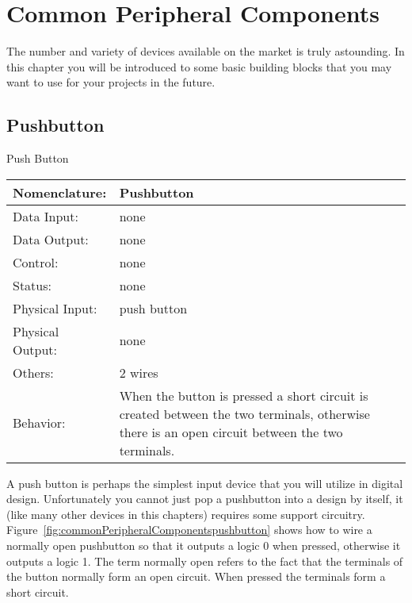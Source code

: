 \chapter{Common Peripheral Components}
\label{chapter:Common Peripheral Components}
\graphicspath{ {./chapter10/Fig} }

The number and variety of devices available on the market
is truly astounding.  In this chapter you will be introduced
to some basic building blocks that you may want to use for
your projects in the future.

\section{Pushbutton}
    \label{page:pushbutton}
    \begin{buildingblock}{Push Button}
        \begin{tabular}{|l|p{3.5in}|} \hline
            Nomenclature:  & Pushbutton         \\ \hline
            Data Input:    & none         \\ \hline
            Data Output:   & none   \\ \hline
            Control:       & none           \\ \hline
            Status:        & none                                   \\ \hline
            Physical Input:& push button        \\ \hline
            Physical Output:& none        \\ \hline
            Others:        & 2 wires             \\ \hline
            Behavior:      & When the button is pressed a short circuit is created
            between the two terminals, otherwise there is an open circuit between
            the two terminals. \\ \hline
        \end{tabular}
    \end{buildingblock}

    A push button is perhaps the simplest input device that you will
    utilize in digital design.  Unfortunately you cannot just pop
    a pushbutton into a design by itself, it (like many other devices
    in this chapters) requires some support circuitry.
    Figure~\ref{fig:commonPeripheralComponentspushbutton} shows how to wire a normally open
    pushbutton so that it outputs a logic 0 when pressed, otherwise
    it outputs a logic 1.  The term normally open refers to the fact
    that the terminals of the button normally form an open circuit.
    When pressed the terminals form a short circuit.

